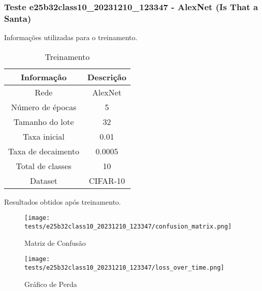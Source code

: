 \subsubsection{Teste e25b32class10_20231210_123347 - AlexNet (Is That a Santa)}

Informações utilizadas para o treinamento.

\begin{table}[ht]
   \centering
   \caption{Treinamento}
   \label{tab:modelos}
   \begin{tabular}{| c | c | }
      \hline 
      \textbf{Informação} & \textbf{Descrição} \\
      \hline \hline 
      Rede & AlexNet \\
      \hline
      Número de épocas & 5\\
      \hline
      Tamanho do lote & 32\\
      \hline
      Taxa inicial & 0.01 \\
      \hline
      Taxa de decaimento & 0.0005 \\
      \hline
      Total de classes & 10\\
      \hline
      Dataset & CIFAR-10\\
      \hline
   \end{tabular} 
\end{table}

Resultados obtidos após treinamento.


\begin{figure}[ht]
 \begin{center}
   \texttt{[image: tests/e25b32class10\_20231210\_123347/confusion\_matrix.png]}
  \caption{Matriz de Confusão}
  \label{fig:fig03}
 \end{center}
\end{figure}

\begin{figure}[ht]
 \begin{center}
   \texttt{[image: tests/e25b32class10\_20231210\_123347/loss\_over\_time.png]}
  \caption{Gráfico de Perda}
  \label{fig:fig04}
 \end{center}
\end{figure}
